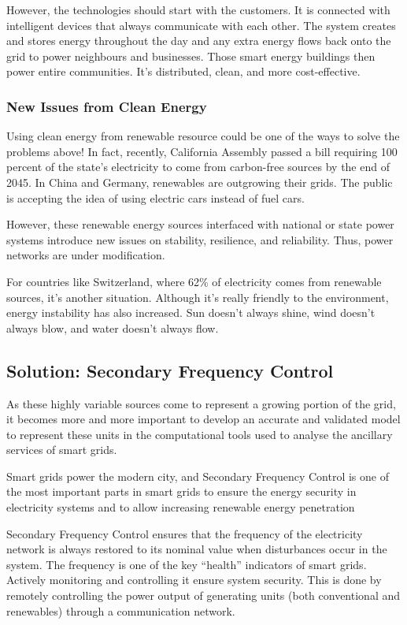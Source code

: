 However, the technologies should start with the customers. It is connected with intelligent devices that always communicate with each other. The system creates and stores energy throughout the day and any extra energy flows back onto the grid to power neighbours and businesses. Those smart energy buildings then power entire communities. It’s distributed, clean, and more cost-effective. 

\subsubsection{New Issues from Clean Energy}
Using clean energy from renewable resource could be one of the ways to solve the problems above! In fact, recently, California Assembly passed a bill requiring 100 percent of the state’s electricity to come from carbon-free sources by the end of 2045. In China and Germany, renewables are outgrowing their grids. The public is accepting the idea of using electric cars instead of fuel cars. 

However, these renewable energy sources interfaced with national or state power systems introduce new issues on stability, resilience, and reliability. Thus, power networks are under modification. 

For countries like Switzerland, where 62\% of electricity comes from renewable sources, it’s another situation. Although it’s really friendly to the environment, energy instability has also increased. Sun doesn’t always shine, wind doesn’t always blow, and water doesn’t always flow. 

\subsection{Solution: Secondary Frequency Control}
As these highly variable sources come to represent a growing portion of the grid, it becomes more and more important to develop an accurate and validated model to represent these units in the computational tools used to analyse the ancillary services of smart grids. 

Smart grids power the modern city, and Secondary Frequency Control is one of the most important parts in smart grids to ensure the energy security in electricity systems and to allow increasing renewable energy penetration 

Secondary Frequency Control ensures that the frequency of the electricity network is always restored to its nominal value when disturbances occur in the system. The frequency is one of the key “health” indicators of smart grids. Actively monitoring and controlling it ensure system security. This is done by remotely controlling the power output of generating units (both conventional and renewables) through a communication network. 